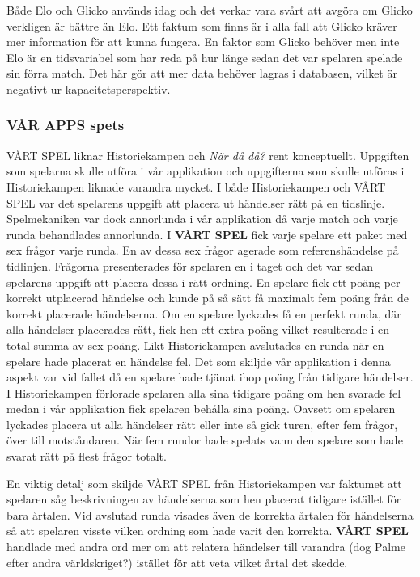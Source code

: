 \documentclass[a4paper, 11pt]{article}
\begin{document}
Både Elo och Glicko används idag och det verkar vara svårt att avgöra om Glicko verkligen är bättre än Elo\cite{stackchess}. Ett faktum som finns är i alla fall att Glicko kräver mer information för att kunna fungera. En faktor som Glicko behöver men inte Elo är en tidsvariabel som har reda på hur länge sedan det var spelaren spelade sin förra match\cite{glickoex}. Det här gör att mer data behöver lagras i databasen, vilket är negativt ur kapacitetsperspektiv.

\subsubsection{VÅR APPS spets}
VÅRT SPEL liknar Historiekampen och \textit{När då då?} rent konceptuellt. Uppgiften som spelarna skulle utföra i vår applikation och uppgifterna som skulle utföras i Historiekampen liknade varandra mycket. I både Historiekampen och VÅRT SPEL var det spelarens uppgift att placera ut händelser rätt på en tidslinje. Spelmekaniken var dock annorlunda i vår applikation då varje match och varje runda behandlades annorlunda. I \textbf{VÅRT SPEL} fick varje spelare ett paket med sex frågor varje runda. En av dessa sex frågor agerade som referenshändelse på tidlinjen. Frågorna presenterades för spelaren en i taget och det var sedan spelarens uppgift att placera dessa i rätt ordning. En spelare fick ett poäng per korrekt utplacerad händelse och kunde på så sätt få maximalt fem poäng från de korrekt placerade händelserna. Om en spelare lyckades få en perfekt runda, där alla händelser placerades rätt, fick hen ett extra poäng vilket resulterade i en total summa av sex poäng. Likt Historiekampen avslutades en runda när en spelare hade placerat en händelse fel. Det som skiljde vår applikation i denna aspekt var vid fallet då en spelare hade tjänat ihop poäng från tidigare händelser. I Historiekampen förlorade spelaren alla sina tidigare poäng om hen svarade fel medan i vår applikation fick spelaren behålla sina poäng. Oavsett om spelaren lyckades placera ut alla händelser rätt eller inte så gick turen, efter fem frågor, över till motståndaren. När fem rundor hade spelats vann den spelare som hade svarat rätt på flest frågor totalt.  

En viktig detalj som skiljde VÅRT SPEL från Historiekampen var faktumet att spelaren såg beskrivningen av händelserna som hen placerat tidigare istället för bara årtalen. Vid avslutad runda visades även de korrekta årtalen för händelserna så att spelaren visste vilken ordning som hade varit den korrekta. \textbf{VÅRT SPEL} handlade med andra ord mer om att relatera händelser till varandra (dog Palme efter andra världskriget?) istället för att veta vilket årtal det skedde.
\end{document}

